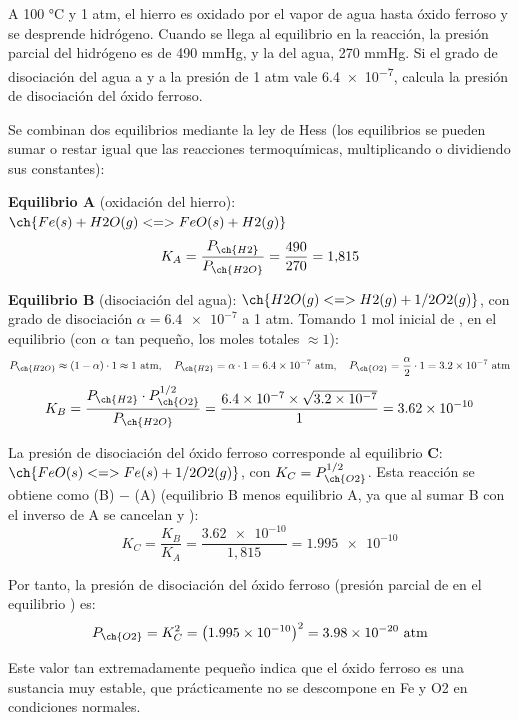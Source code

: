 \begin{exercise}    %
    A 100 °C y 1 atm, el hierro es oxidado por el vapor de agua hasta óxido ferroso y se desprende hidrógeno.
    Cuando se llega al equilibrio en la reacción, la presión parcial del hidrógeno es de 490 mmHg, y la del agua, 270 mmHg. Si el
    grado de disociación del agua a  y a la presión de 1 atm vale \num{6.4e-7}, calcula la presión de disociación del
    óxido ferroso.
    \begin{solu}
        Se combinan dos equilibrios mediante la ley de Hess (los equilibrios se pueden sumar o restar igual que las reacciones termoquímicas, multiplicando o dividiendo sus constantes):

        \textbf{Equilibrio A} (oxidación del hierro): \(\ch{Fe (s) + H2O (g) <=> FeO (s) + H2 (g)}\)
        \[
            K_A = \frac{P_{\ch{H2}}}{P_{\ch{H2O}}} = \frac{490}{270} = 1{,}815
        \]

        \textbf{Equilibrio B} (disociación del agua): \(\ch{H2O (g) <=> H2 (g) + 1/2 O2 (g)}\), con grado de disociación \(\alpha = \num{6.4e-7}\) a 1 atm. Tomando 1 mol inicial de , en el equilibrio (con \(\alpha\) tan pequeño, los moles totales \(\approx 1\)):
        \[
            P_{\ch{H2O}} \approx (1-\alpha)\cdot 1 \approx 1\ \text{atm}, \quad P_{\ch{H2}} = \alpha \cdot 1 = \num{6.4e-7}\ \text{atm}, \quad P_{\ch{O2}} = \frac{\alpha}{2}\cdot 1 = \num{3.2e-7}\ \text{atm}
        \]
        \[
            K_B = \frac{P_{\ch{H2}} \cdot P_{\ch{O2}}^{1/2}}{P_{\ch{H2O}}} = \frac{\num{6.4e-7} \times \sqrt{\num{3.2e-7}}}{1} = \num{3.62e-10}
        \]

        La presión de disociación del óxido ferroso corresponde al equilibrio \textbf{C}: \(\ch{FeO (s) <=> Fe (s) + 1/2 O2 (g)}\), con \(K_C = P_{\ch{O2}}^{1/2}\). Esta reacción se obtiene como (B) \(-\) (A) (equilibrio B menos equilibrio A, ya que al sumar B con el inverso de A se cancelan  y ):
        \[
            K_C = \frac{K_B}{K_A} = \frac{\num{3.62e-10}}{1{,}815} = \num{1.995e-10}
        \]

        Por tanto, la presión de disociación del óxido ferroso (presión parcial de  en el equilibrio ) es:
        \[
            P_{\ch{O2}} = K_C^2 = \left(\num{1.995e-10}\right)^2 = \num{3.98e-20}\ \text{atm}
        \]

        Este valor tan extremadamente pequeño indica que el óxido ferroso es una sustancia muy estable, que prácticamente no se descompone en Fe y O2 en condiciones normales.
    \end{solu}
\end{exercise}

